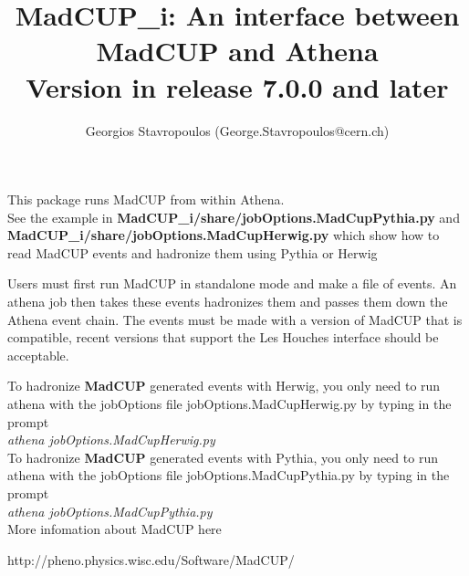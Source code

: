 \documentclass[11pt]{article}
\begin{document}
\title{MadCUP\_i: An interface between MadCUP and Athena\\
Version in release 7.0.0 and later}
\author{  Georgios Stavropoulos (George.Stavropoulos@cern.ch) }

\maketitle           

This package runs MadCUP  from within Athena. \\See the example
in {\bf MadCUP\_i/share/jobOptions.MadCupPythia.py } and {\bf
  MadCUP\_i/share/jobOptions.MadCupHerwig.py }  which show how to
read MadCUP events and hadronize them using Pythia or Herwig

Users must first run 
MadCUP in standalone mode and make a file of events. An athena job
then takes these events hadronizes them and passes them down the
Athena event chain. The events must be made with a version of MadCUP
that is compatible, recent versions that support the Les Houches
interface should be acceptable.


To hadronize {\bf MadCUP} generated events with Herwig, you only need to run athena with the jobOptions
file jobOptions.MadCupHerwig.py by typing in the prompt \\
{\it athena jobOptions.MadCupHerwig.py}\\

To hadronize {\bf MadCUP} generated events with Pythia, you only need to run athena with the jobOptions
file jobOptions.MadCupPythia.py by typing in the prompt \\
{\it athena jobOptions.MadCupPythia.py}\\


More infomation about MadCUP  here

http://pheno.physics.wisc.edu/Software/MadCUP/
\end{document}
